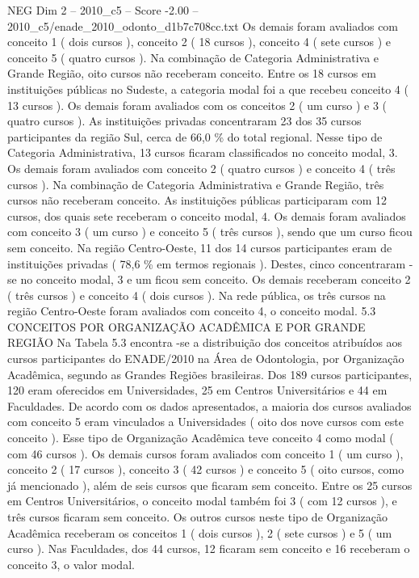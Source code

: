 \begin{textsample}{NEG Dim 2 – 2010\_c5 – Score -2.00 – 2010\_c5/enade\_2010\_odonto\_d1b7c708cc.txt}
Os demais foram avaliados com conceito 1 ( dois cursos ), conceito 2 ( 18 cursos ), conceito 4 ( sete cursos ) e conceito 5 ( quatro cursos ).
Na combinação de Categoria Administrativa e Grande Região, oito cursos não receberam conceito.
Entre os 18 cursos em instituições públicas no Sudeste, a categoria modal foi a que recebeu conceito 4 ( 13 cursos ).
Os demais foram avaliados com os conceitos 2 ( um curso ) e 3 ( quatro cursos ).
As instituições privadas concentraram 23 dos 35 cursos participantes da região Sul, cerca de 66,0 \% do total regional.
Nesse tipo de Categoria Administrativa, 13 cursos ficaram classificados no conceito modal, 3.
Os demais foram avaliados com conceito 2 ( quatro cursos ) e conceito 4 ( três cursos ).
Na combinação de Categoria Administrativa e Grande Região, três cursos não receberam conceito.
As instituições públicas participaram com 12 cursos, dos quais sete receberam o conceito modal, 4.
Os demais foram avaliados com conceito 3 ( um curso ) e conceito 5 ( três cursos ), sendo que um curso ficou sem conceito.
Na região Centro-Oeste, 11 dos 14 cursos participantes eram de instituições privadas ( 78,6 \% em termos regionais ).
Destes, cinco concentraram -se no conceito modal, 3 e um ficou sem conceito.
Os demais receberam conceito 2 ( três cursos ) e conceito 4 ( dois cursos ).
Na rede pública, os três cursos na região Centro-Oeste foram avaliados com conceito 4, o conceito modal. 5.3 CONCEITOS POR ORGANIZAÇÃO ACADÊMICA E POR GRANDE REGIÃO Na Tabela 5.3 encontra -se a distribuição dos conceitos atribuídos aos cursos participantes do ENADE/2010 na Área de Odontologia, por Organização Acadêmica, segundo as Grandes Regiões brasileiras.
Dos 189 cursos participantes, 120 eram oferecidos em Universidades, 25 em Centros Universitários e 44 em Faculdades.
De acordo com os dados apresentados, a maioria dos cursos avaliados com conceito 5 eram vinculados a Universidades ( oito dos nove cursos com este conceito ).
Esse tipo de Organização Acadêmica teve conceito 4 como modal ( com 46 cursos ).
Os demais cursos foram avaliados com conceito 1 ( um curso ), conceito 2 ( 17 cursos ), conceito 3 ( 42 cursos ) e conceito 5 ( oito cursos, como já mencionado ), além de seis cursos que ficaram sem conceito.
Entre os 25 cursos em Centros Universitários, o conceito modal também foi 3 ( com 12 cursos ), e três cursos ficaram sem conceito.
Os outros cursos neste tipo de Organização Acadêmica receberam os conceitos 1 ( dois cursos ), 2 ( sete cursos ) e 5 ( um curso ).
Nas Faculdades, dos 44 cursos, 12 ficaram sem conceito e 16 receberam o conceito 3, o valor modal.

\end{textsample}
